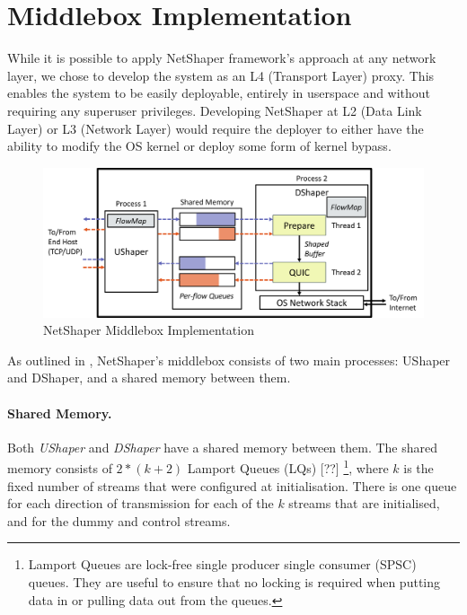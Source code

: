 \section{Middlebox Implementation}
\label{sec:netshaper-middlebox-implementation}

While it is possible to apply NetShaper framework's approach at any network layer, we chose to develop the system as an L4 (Transport Layer) proxy.
This enables the system to be easily deployable, entirely in userspace and without requiring any superuser privileges. 
Developing NetShaper at L2 (Data Link Layer) or L3 (Network Layer) would require the deployer to either have the ability to modify the OS kernel or deploy some form of kernel bypass.

\begin{figure}[!htb]
    \centering
    \includegraphics[width=\columnwidth]{figures/netshaper/middlebox-implementation.png}
    \caption{NetShaper Middlebox Implementation}
    \label{fig:middlebox-implementation}
\end{figure}

As outlined in , NetShaper's middlebox consists of two main processes: UShaper and DShaper, and a shared memory between them.

\paragraph{Shared Memory.}
Both \textit{UShaper} and \textit{DShaper} have a shared memory between them.
The shared memory consists of $2*(k + 2)$ Lamport Queues (LQs) [??]
\footnote{Lamport Queues are lock-free single producer single consumer (SPSC) queues. They are useful to ensure that no locking is required when putting data in or pulling data out from the queues.}, 
where $k$ is the fixed number of streams that were configured at initialisation.
There is one queue for each direction of transmission for each of the $k$ streams that are initialised, and for the dummy and control streams.


